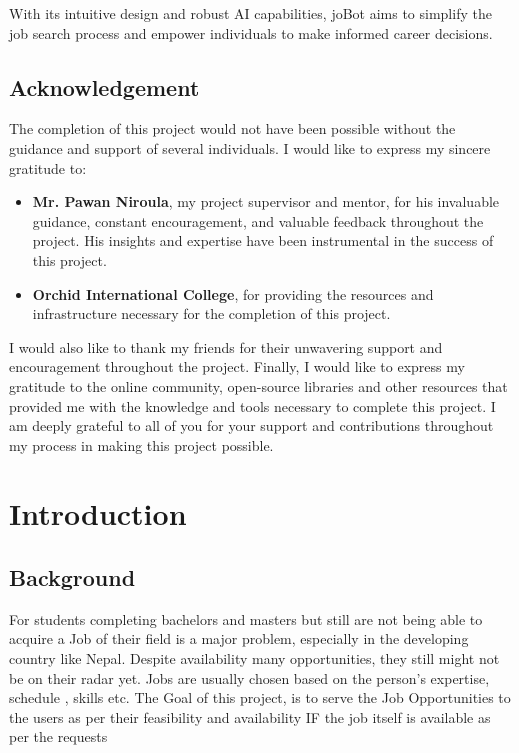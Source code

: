 \documentclass[a4paper,12pt]{report}
\begin{document}
        With its intuitive design and robust AI capabilities, joBot aims to simplify the job search process and empower individuals to make informed career decisions.

        \newpage
    
    

    \begin{center}
        \section*{Acknowledgement}
    \end{center}
    

    The completion of this project would not have been possible without the guidance and support of several individuals. I would like to express my sincere gratitude to:
    \begin{itemize}
        \item  \textbf{Mr. Pawan Niroula}, my project supervisor and mentor, for his invaluable guidance, constant encouragement, and valuable feedback throughout the project. His insights and expertise have been instrumental in the success of this project.
        \item \textbf{Orchid International College}, for providing the resources and infrastructure necessary for the completion of this project.

    \end{itemize}
    I would also like to thank my friends for their unwavering support and encouragement throughout the project.
    Finally, I would like to express my gratitude to the online community, open-source libraries and other resources that provided me with the knowledge and tools necessary to complete this project.
    I am deeply grateful to all of you for your support and contributions throughout my process in making this project possible.
    \newpage

    \chapter{Introduction}
        \section{Background}
        For students completing bachelors and masters but still are not being able to acquire a Job of their field is a major problem, especially in the developing country like Nepal. Despite availability many opportunities, they still might not be on their radar yet. Jobs are usually chosen based on the person’s expertise, schedule , skills etc. The Goal of this project, is to serve the Job Opportunities to the users as per their feasibility and availability IF the job itself is available as per the requests
\end{document}
